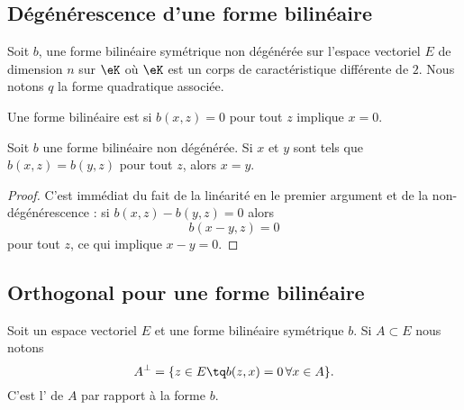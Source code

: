 \subsection{Dégénérescence d'une forme bilinéaire}

Soit \( b\), une forme bilinéaire symétrique non dégénérée  sur l'espace vectoriel \( E\) de dimension \( n\) sur \( \eK\) où \( \eK\) est un corps de caractéristique différente de \( 2\). Nous notons \( q\) la forme quadratique associée.

\begin{definition}      \label{DEFooNUBFooLfCqaK}
	Une forme bilinéaire est  si \( b(x,z)=0\) pour tout \( z\) implique \( x=0\).
\end{definition}

\begin{lemma}   \label{LemyKJpVP}
	Soit \( b\) une forme bilinéaire non dégénérée. Si \( x\) et \( y\) sont tels que \( b(x,z)=b(y,z)\) pour tout \( z\), alors \( x=y\).
\end{lemma}

\begin{proof}
	C'est immédiat du fait de la linéarité en le premier argument et de la non-dégénérescence : si \( b(x,z)-b(y,z)=0\) alors
	\begin{equation}
		b(x-y,z)=0
	\end{equation}
	pour tout \( z\), ce qui implique \( x-y=0\).
\end{proof}

\subsection{Orthogonal pour une forme bilinéaire}

\begin{definition}	\label{DEFooENZGooXMWfUy}
	Soit un espace vectoriel \( E\) et une forme bilinéaire symétrique \( b\). Si \( A\subset E\) nous notons
	\begin{equation}
		A^{\perp}=\{ z\in E\tq b(z,x)=0\,\forall x\in A \}.
	\end{equation}
	C'est l' de \( A\) par rapport à la forme \( b\).
\end{definition}

